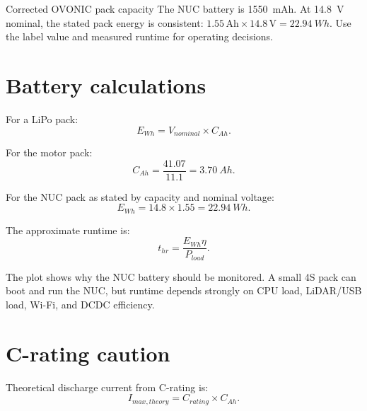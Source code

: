 \begin{designbox}{Corrected OVONIC pack capacity}
The NUC battery is \SI{1550}{mAh}.  At \SI{14.8}{V} nominal, the stated pack energy is consistent: \(1.55\,\mathrm{Ah}\times14.8\,\mathrm{V}=\SI{22.94}{Wh}\).  Use the label value and measured runtime for operating decisions.
\end{designbox}

\section{Battery calculations}
For a LiPo pack:
\begin{equation}
E_{Wh}=V_{nominal} \times C_{Ah}.
\end{equation}

For the motor pack:
\begin{equation}
C_{Ah}=\frac{41.07}{11.1}=\SI{3.70}{Ah}.
\end{equation}

For the NUC pack as stated by capacity and nominal voltage:
\begin{equation}
E_{Wh}=14.8 \times 1.55=\SI{22.94}{Wh}.
\end{equation}

The approximate runtime is:
\begin{equation}
t_{hr}=\frac{E_{Wh}\eta}{P_{load}}.
\end{equation}

\begin{center}
\end{center}

The plot shows why the NUC battery should be monitored.  A small 4S pack can boot and run the NUC, but runtime depends strongly on CPU load, LiDAR/USB load, Wi-Fi, and DCDC efficiency.

\section{C-rating caution}
Theoretical discharge current from C-rating is:
\begin{equation}
I_{max,theory}=C_{rating} \times C_{Ah}.
\end{equation}

